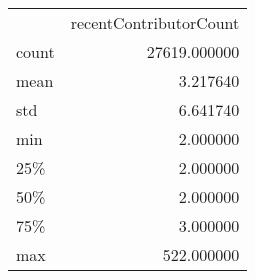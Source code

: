 \begin{tabular}{lr}
 & recentContributorCount \\
count & 27619.000000 \\
mean & 3.217640 \\
std & 6.641740 \\
min & 2.000000 \\
25\% & 2.000000 \\
50\% & 2.000000 \\
75\% & 3.000000 \\
max & 522.000000 \\
\end{tabular}
